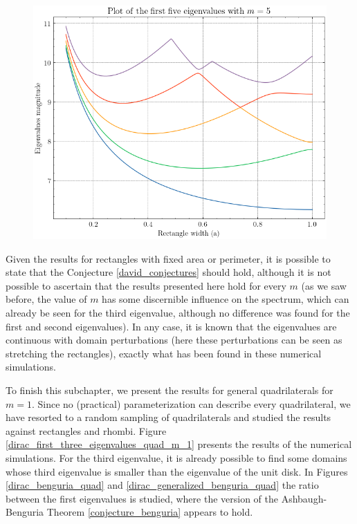 \begin{figure}[!htb]
\begin{minipage}{.5\textwidth}
      \includegraphics[width=1\linewidth]{Images/Dirac/quad/eigenvalues_rectangle_perimeter_width_m_5.png}
      \captionsetup{width=0.9\linewidth} %
      \label{eigenvalues_rectangle_perimeter_width_m_5}
    \end{minipage}
\end{figure}

Given the results for rectangles with fixed area or perimeter, it is possible to state that the Conjecture \ref{david_conjectures} should hold, although it is not possible to ascertain that the results presented here hold for every \(m\) (as we saw before, the value of \(m\) has some discernible influence on the spectrum, which can already be seen for the third eigenvalue, although no difference was found for the first and second eigenvalues). In any case, it is known that the eigenvalues are continuous with domain perturbations (here these perturbations can be seen as stretching the rectangles), exactly what has been found in these numerical simulations.

To finish this subchapter, we present the results for general quadrilaterals for \(m=1\). Since no (practical) parameterization can describe every quadrilateral, we have resorted to a random sampling of quadrilaterals and studied the results against rectangles and rhombi. Figure \ref{dirac_first_three_eigenvalues_quad_m_1} presents the results of the numerical simulations. For the third eigenvalue, it is already possible to find some domains whose third eigenvalue is smaller than the eigenvalue of the unit disk. In Figures \ref{dirac_benguria_quad} and \ref{dirac_generalized_benguria_quad} the ratio between the first eigenvalues is studied, where the version of the Ashbaugh-Benguria Theorem \ref{conjecture_benguria} appears to hold.

